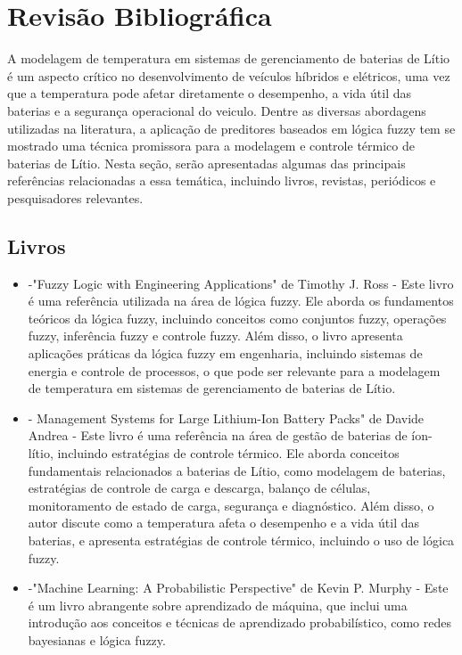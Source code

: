 \section{Revisão Bibliográfica}
A modelagem de temperatura em sistemas de gerenciamento de baterias de Lítio é um aspecto crítico no desenvolvimento de veículos híbridos e elétricos, uma vez que a temperatura pode afetar diretamente o desempenho, a vida útil das baterias e a segurança operacional do veiculo. Dentre as diversas abordagens utilizadas na literatura, a aplicação de preditores baseados em lógica fuzzy tem se mostrado uma técnica promissora para a modelagem e controle térmico de baterias de Lítio. Nesta seção, serão apresentadas algumas das principais referências relacionadas a essa temática, incluindo livros, revistas, periódicos e pesquisadores relevantes.

\subsection{Livros}
\begin{itemize}
    \item \cite{Ross}-"Fuzzy Logic with Engineering Applications" de Timothy J. Ross - Este livro é uma referência utilizada na área de lógica fuzzy. Ele aborda os fundamentos teóricos da lógica fuzzy, incluindo conceitos como conjuntos fuzzy, operações fuzzy, inferência fuzzy e controle fuzzy. Além disso, o livro apresenta aplicações práticas da lógica fuzzy em engenharia, incluindo sistemas de energia e controle de processos, o que pode ser relevante para a modelagem de temperatura em sistemas de gerenciamento de baterias de Lítio.

    \item \cite{Andrea}- Management Systems for Large Lithium-Ion Battery Packs" de Davide Andrea - Este livro é uma referência na área de gestão de baterias de íon-lítio, incluindo estratégias de controle térmico. Ele aborda conceitos fundamentais relacionados a baterias de Lítio, como modelagem de baterias, estratégias de controle de carga e descarga, balanço de células, monitoramento de estado de carga, segurança e diagnóstico. Além disso, o autor discute como a temperatura afeta o desempenho e a vida útil das baterias, e apresenta estratégias de controle térmico, incluindo o uso de lógica fuzzy.

    \item \cite{Murphy}-"Machine Learning: A Probabilistic Perspective" de Kevin P. Murphy - Este é um livro abrangente sobre aprendizado de máquina, que inclui uma introdução aos conceitos e técnicas de aprendizado probabilístico, como redes bayesianas e lógica fuzzy.
\end{itemize}
